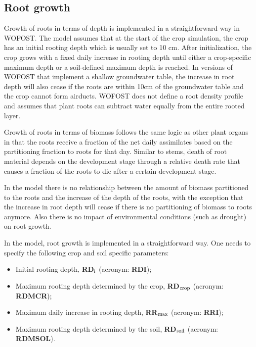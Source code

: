 \subsection{Root growth}
\label{sec:rootgrowth}

Growth of roots in terms of depth is implemented in a straightforward way in WOFOST. 
The model assumes that at the start of the crop simulation, the crop has an initial rooting 
depth which is usually set to 10 cm. After initialization, the crop grows with a fixed daily 
increase in rooting depth until either a crop-specific maximum depth or a soil-defined maximum 
depth is reached. In versions of WOFOST that implement a shallow groundwater table, the 
increase in root depth will also cease if the roots are within 10cm of the groundwater 
table and the crop cannot form airducts. WOFOST does not define a root density profile 
and assumes that plant roots can subtract water equally from the entire rooted layer.

Growth of roots in terms of biomass follows the same logic as other plant organs in that
the roots receive a fraction of the net daily assimilates based on the partitioning 
fraction to roots for that day. Similar to stems, death of root material depends on 
the development stage through a relative death rate that causes a fraction of the 
roots to die after a certain development stage.

In the model there is no relationship between the amount of biomass partitioned to the roots 
and the increase of the depth of the roots, with the exception that the increase in root
depth will cease if there is no partitioning of biomass to roots anymore. Also there is 
no impact of environmental conditions (such as drought) on root growth.

In the model, root growth is implemented in a straightforward way. One needs to specify
the following crop and soil specific parameters:
\begin{itemize}
	\item Initial rooting depth, {\bf RD$_{{\rm i}}$} (acronym: {\bf RDI});
	\item Maximum rooting depth determined by the crop, {\bf RD$_{{\rm crop}}$} (acronym: {\bf RDMCR});
	\item Maximum daily increase in rooting depth, {\bf RR$_{{\rm max}}$} (acronym: {\bf RRI});
	\item Maximum rooting depth determined by the soil, {\bf RD$_{{\rm soil}}$} (acronym: {\bf RDMSOL}).
\end{itemize}

